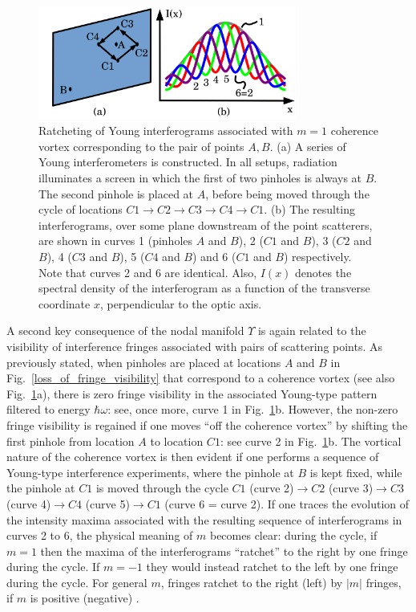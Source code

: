 \documentclass[%
 reprint,
 amsmath,amssymb,
 aps,
]{revtex4-1}
\begin{document}
\begin{figure}
\includegraphics[width=8.5cm]{Figures/Anholonomy.png}
\caption{Ratcheting of Young interferograms associated with $m=1$ coherence vortex corresponding to the pair of points $A,B$.  (a) A series of Young interferometers is constructed.  In all setups, radiation illuminates a screen in which the first of two pinholes is always at $B$.  The second pinhole is placed at $A$, before being moved through the cycle of locations $C1 \rightarrow C2 \rightarrow C3 \rightarrow C4 \rightarrow C1$.  (b) The resulting interferograms, over some plane downstream of the point scatterers, are shown in curves 1 (pinholes $A$ and $B$), 2 ($C1$ and $B$), 3 ($C2$ and $B$), 4 ($C3$ and $B$), 5 ($C4$ and $B$) and 6 ($C1$ and $B$) respectively. Note that curves 2 and 6 are identical.  Also, $I(x)$ denotes the spectral density of the interferogram as a function of the transverse coordinate $x$, perpendicular to the optic axis.}
\label{Young_fringe_anholonomy}
\end{figure}

A second key consequence of the nodal manifold $\Upsilon$ is again related to the visibility of interference fringes associated with pairs of scattering points.  As previously stated, when pinholes are placed at locations $A$ and $B$ in Fig.~\ref{loss_of_fringe_visibility} that correspond to a coherence vortex (see also Fig.~\ref{Young_fringe_anholonomy}a), there is zero fringe visibility in the associated Young-type pattern filtered to energy $\hbar \omega$: see, once more, curve 1 in Fig.~\ref{Young_fringe_anholonomy}b.  However, the non-zero fringe visibility is regained if one moves ``off the coherence vortex'' by shifting the first pinhole from location $A$ to location $C1$: see curve 2 in Fig.~\ref{Young_fringe_anholonomy}b.  The vortical nature of the coherence vortex is then evident if one performs a sequence of Young-type interference experiments, where the pinhole at $B$ is kept fixed, while the pinhole at $C1$ is moved through the cycle $C1$ (curve 2)$\rightarrow C2$ (curve 3)$\rightarrow C3$ (curve 4)$\rightarrow C4$ (curve 5)$\rightarrow C1$ (curve 6 = curve 2). If one traces the evolution of the intensity maxima associated with the resulting sequence of interferograms in curves 2 to 6, the physical meaning of $m$ becomes clear: during the cycle, if $m=1$ then the maxima of the interferograms  ``ratchet'' to the right by one fringe during the cycle. If $m=-1$ they would instead ratchet to the left by one fringe during the cycle.  For general $m$, fringes  ratchet to the right (left) by $|m|$ fringes, if $m$ is positive (negative) \cite{Marasinghe2010}.
\end{document}
